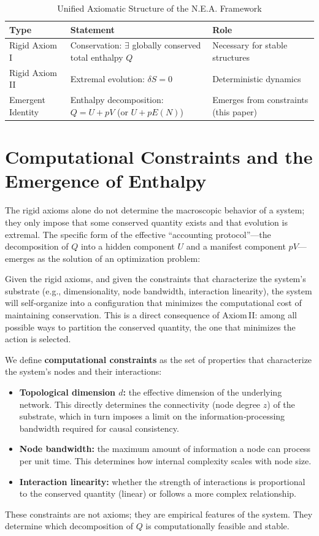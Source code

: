\documentclass{article}
\begin{document}
\begin{table}[htbp]
\centering
\caption{Unified Axiomatic Structure of the N.E.A. Framework}
\begin{tabular}{|l|l|l|}
\hline
Type & Statement & Role \\
\hline
Rigid Axiom I & Conservation: $\exists$ globally conserved total enthalpy $Q$ & Necessary for stable structures \\
Rigid Axiom II & Extremal evolution: $\delta S = 0$ & Deterministic dynamics \\
Emergent Identity & Enthalpy decomposition: $Q = U + pV$ (or $U + pE(N)$) & Emerges from constraints (this paper) \\
\hline
\end{tabular}
\end{table}

\section{Computational Constraints and the Emergence of Enthalpy}
The rigid axioms alone do not determine the macroscopic behavior of a system; they only impose that some conserved quantity exists and that evolution is extremal. The specific form of the effective “accounting protocol”—the decomposition of $Q$ into a hidden component $U$ and a manifest component $pV$—emerges as the solution of an optimization problem:

Given the rigid axioms, and given the constraints that characterize the system’s substrate (e.g., dimensionality, node bandwidth, interaction linearity), the system will self‑organize into a configuration that minimizes the computational cost of maintaining conservation. This is a direct consequence of Axiom II: among all possible ways to partition the conserved quantity, the one that minimizes the action is selected.

We define \textbf{computational constraints} as the set of properties that characterize the system’s nodes and their interactions:
\begin{itemize}
    \item \textbf{Topological dimension $d$:} the effective dimension of the underlying network. This directly determines the connectivity (node degree $z$) of the substrate, which in turn imposes a limit on the information‑processing bandwidth required for causal consistency.
    \item \textbf{Node bandwidth:} the maximum amount of information a node can process per unit time. This determines how internal complexity scales with node size.
    \item \textbf{Interaction linearity:} whether the strength of interactions is proportional to the conserved quantity (linear) or follows a more complex relationship.
\end{itemize}
These constraints are not axioms; they are empirical features of the system. They determine which decomposition of $Q$ is computationally feasible and stable.
\end{document}
